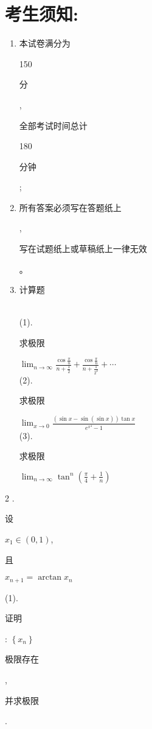 \documentclass[10pt]{article}
\begin{document}
\section{考生须知:}
\begin{enumerate}
  \item \begin{CJK}{UTF8}{mj}本试卷满分为\end{CJK} 150 \begin{CJK}{UTF8}{mj}分\end{CJK}, \begin{CJK}{UTF8}{mj}全部考试时间总计\end{CJK} 180 \begin{CJK}{UTF8}{mj}分钟\end{CJK};

  \item \begin{CJK}{UTF8}{mj}所有答案必须写在答题纸上\end{CJK}, \begin{CJK}{UTF8}{mj}写在试题纸上或草稿纸上一律无效\end{CJK}。

  \item \begin{CJK}{UTF8}{mj}计算题\end{CJK}\\
(1). \begin{CJK}{UTF8}{mj}求极限\end{CJK} $\lim _{n \rightarrow \infty} \frac{\cos \frac{\pi}{n}}{n+\frac{1}{2}}+\frac{\cos \frac{\pi}{n}}{n+\frac{1}{2^{2}}}+\cdots$\\
(2). \begin{CJK}{UTF8}{mj}求极限\end{CJK} $\lim _{x \rightarrow 0} \frac{(\sin x-\sin (\sin x)) \tan x}{e^{x^{4}}-1}$\\
(3). \begin{CJK}{UTF8}{mj}求极限\end{CJK} $\lim _{n \rightarrow \infty} \tan ^{n}\left(\frac{\pi}{4}+\frac{1}{n}\right)$

\end{enumerate}
2 . \begin{CJK}{UTF8}{mj}设\end{CJK} $x_{1} \in(0,1)$, \begin{CJK}{UTF8}{mj}且\end{CJK} $x_{n+1}=\arctan x_{n}$

(1). \begin{CJK}{UTF8}{mj}证明\end{CJK}: $\left\{x_{n}\right\}$ \begin{CJK}{UTF8}{mj}极限存在\end{CJK}, \begin{CJK}{UTF8}{mj}并求极限\end{CJK}.
\end{document}
